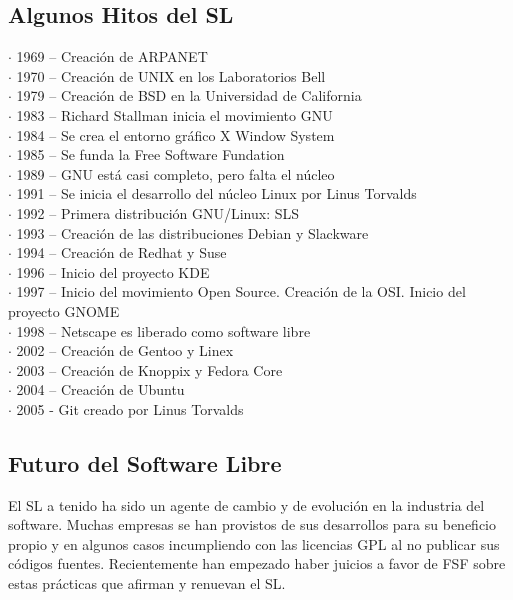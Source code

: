 \documentclass{book}
\begin{document}
\subsection{Algunos Hitos del SL}

\begin{description}
\item[$\cdot$ 1969 – Creación de ARPANET]
\item[$\cdot$ 1970 – Creación de UNIX en los Laboratorios Bell]
\item[$\cdot$ 1979 – Creación de BSD en la Universidad de California]
\item[$\cdot$ 1983 – Richard Stallman inicia el movimiento GNU]
\item[$\cdot$ 1984 – Se crea el entorno gráfico X Window System]
\item[$\cdot$ 1985 – Se funda la Free Software Fundation]
\item[$\cdot$ 1989 – GNU está casi completo, pero falta el núcleo]
\item[$\cdot$ 1991 – Se inicia el desarrollo del núcleo Linux por Linus Torvalds]
\item[$\cdot$ 1992 – Primera distribución GNU/Linux: SLS]
\item[$\cdot$ 1993 – Creación de las distribuciones Debian y Slackware]
\item[$\cdot$ 1994 – Creación de Redhat y Suse]
\item[$\cdot$ 1996 – Inicio del proyecto KDE]
\item[$\cdot$ 1997 – Inicio del movimiento Open Source. Creación de la OSI. Inicio del proyecto GNOME]
\item[$\cdot$ 1998 – Netscape es liberado como software libre]
\item[$\cdot$ 2002 – Creación de Gentoo y Linex]
\item[$\cdot$ 2003 – Creación de Knoppix y Fedora Core]
\item[$\cdot$ 2004 – Creación de Ubuntu]
\item[$\cdot$ 2005 - Git creado por Linus Torvalds]
\end{description}

\subsection{Futuro del Software Libre}


	El SL a tenido ha sido un agente de cambio y de evolución en la industria del software.
Muchas empresas se han provistos de sus desarrollos para su beneficio propio y en algunos casos incumpliendo con las licencias GPL al no publicar sus códigos fuentes.
	Recientemente han empezado haber juicios a favor de FSF sobre estas prácticas que afirman y renuevan el SL.
\end{document}
